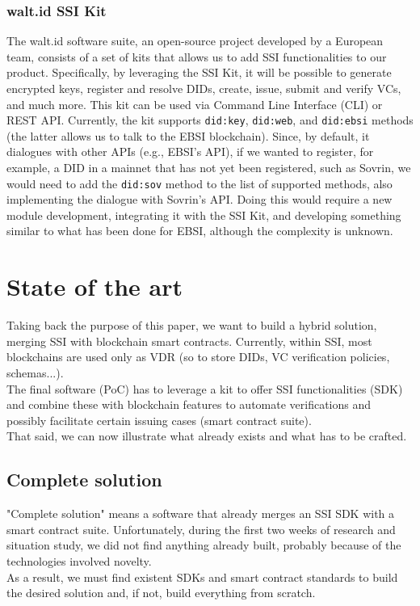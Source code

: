 \subsubsection{walt.id SSI Kit}
The walt.id software suite, an open-source project developed by a European team, 
consists of a set of kits that allows us to add SSI functionalities to our product. 
Specifically, by leveraging the SSI Kit, it will be possible to generate encrypted 
keys, register and resolve DIDs, create, issue, submit and verify VCs, and much more. 
This kit can be used via Command Line Interface (CLI) or REST API. Currently, the 
kit supports \texttt{did:key}, \texttt{did:web}, and \texttt{did:ebsi} methods (the 
latter allows us to talk to the EBSI blockchain). Since, by default, it dialogues with 
other APIs (e.g., EBSI's API), if we wanted to register, for example, a DID in a 
mainnet that has not yet been registered, such as Sovrin, we would need to add the 
\texttt{did:sov} method to the list of supported methods, also implementing the 
dialogue with Sovrin's API. Doing this would require a new module development, 
integrating it with the SSI Kit, and developing something similar to what has been 
done for EBSI, although the complexity is unknown.
\section{State of the art}
Taking back the purpose of this paper, we want to build a hybrid solution, merging SSI 
with blockchain smart contracts. Currently, within SSI, most blockchains are used only 
as VDR (so to store DIDs, VC verification policies, schemas...).\\
The final software (PoC) has to leverage a kit to offer SSI functionalities (SDK) and 
combine these with blockchain features to automate verifications and possibly 
facilitate certain issuing cases (smart contract suite).\\
That said, we can now illustrate what already exists and what has to be crafted.
\subsection{Complete solution}
"Complete solution" means a software that already merges an SSI SDK with a smart 
contract suite. Unfortunately, during the first two weeks of research and situation 
study, we did not find anything already built, probably because of the technologies 
involved novelty.\\
As a result, we must find existent SDKs and smart contract standards to build the 
desired solution and, if not, build everything from scratch.
